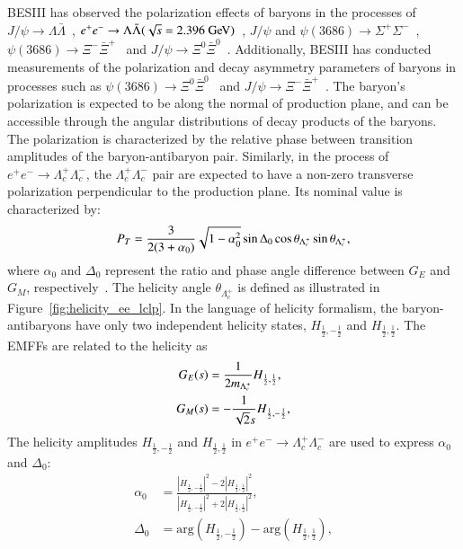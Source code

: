 BESIII has observed the polarization effects of baryons in the processes of  $J/\psi \to \Lambda\bar{\Lambda}$~\cite{BESIII:2018cnd,BESIII:2022qax}, $e^+e^-\to\Lambda\bar{\Lambda}(\sqrt{s}=2.396\gev)$~\cite{BESIII:2019nep}, $J/\psi$ and $\psi(3686) \to \Sigma^+\Sigma^-$~\cite{BESIII:2020fqg}, $\psi(3686) \to \Xi^-\bar{\Xi}^+$~\cite{BESIII:2022lsz} and $J/\psi \to \Xi^0\bar{\Xi}^0$~\cite{BESIII:2023drj}. Additionally, BESIII has conducted measurements of the polarization and decay asymmetry parameters of baryons in processes such as $\psi(3686) \to \Xi^0\bar{\Xi}^0$~\cite{BESIII:2023lkg} and $J/\psi \to \Xi^-\bar{\Xi}^+$~\cite{BESIII:2021ypr}. The baryon's polarization is expected to be along the normal of production plane, and can be accessible through the angular distributions of decay products of the baryons. The polarization is characterized by the relative phase between transition amplitudes of the baryon-antibaryon pair. Similarly, in the process of $e^+e^- \to \Lambda_c^+\Lambda_c^-$, the $\Lambda_c^+\Lambda_c^-$ pair are expected to have a non-zero transverse polarization  perpendicular to the production plane. Its nominal value is characterized by:
\begin{equation}
    P_T = \frac{3}{2(3+\alpha_0)}\sqrt{1-\alpha_0^2}\sin\Delta_0\cos\theta_{\Lambda_{c}^{+}}\sin\theta_{\Lambda_{c}^{+}},
    \label{eq:eq_polar}
\end{equation}
where $\alpha_0$ and $\Delta_0$ represent the ratio and phase angle difference between $G_E$ and $G_M$, respectively~\cite{Chen:2019hqi}. The helicity angle $\theta_{\Lambda_c^+}$ is defined as illustrated in Figure~\ref{fig:helicity_ee_lclp}. In the language of helicity formalism, the baryon-antibaryons have only two independent helicity states, $H_{\frac{1}{2},-\frac{1}{2}}$ and $H_{\frac{1}{2},\frac{1}{2}}$. The EMFFs are related to the helicity as
\begin{equation}
    \begin{split}
        G_E(s) &= \frac{1}{2m_{\Lambda_{c}^{+}}}H_{\frac{1}{2},\frac{1}{2}}, \\
        G_M(s) &= -\frac{1}{\sqrt{2}s}H_{\frac{1}{2},-\frac{1}{2}},
    \end{split}
\end{equation}
The helicity amplitudes $H_{\frac{1}{2},-\frac{1}{2}}$ and $H_{\frac{1}{2},\frac{1}{2}}$ in $e^+e^- \to \Lambda_c^+\Lambda_c^-$ are used to express $\alpha_0$ and $\Delta_0$:
\begin{equation}
    \begin{split}
    \alpha_0 &= \frac{|H_{\frac{1}{2},-\frac{1}{2}}|^2 - 2|H_{\frac{1}{2},\frac{1}{2}}|^2}{|H_{\frac{1}{2},-\frac{1}{2}}|^2 + 2|H_{\frac{1}{2},\frac{1}{2}}|^2}, \\
    \Delta_0 &= \mathrm{arg}(H_{\frac{1}{2},-\frac{1}{2}}) - \mathrm{arg}(H_{\frac{1}{2},\frac{1}{2}}),
    \end{split}
    \label{eq:eq_alpha_delta0}
\end{equation}

